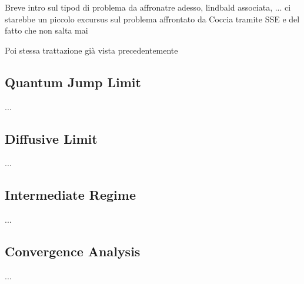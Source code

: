 \documentclass[a4paper,12pt]{article}
\begin{document}
	Breve intro sul tipod di problema da affronatre adesso, lindbald associata, ... ci starebbe un piccolo excursus sul problema affrontato da Coccia tramite SSE e del fatto che non salta mai
	
	Poi stessa trattazione già vista precedentemente
	\subsection{Quantum Jump Limit}
	\label{sub:QJ_limit_Photo}
	...
	
	\subsection{Diffusive Limit} 
	\label{sub:Diffusive_limit_Photo}
	...
	
	\subsection{Intermediate Regime} 
	\label{sub:Intermediate_Regime_Photo}
	...
	
	\subsection{Convergence Analysis}
	\label{sub:Convergence_Analysis_Photo}
	...
	
\end{document}
